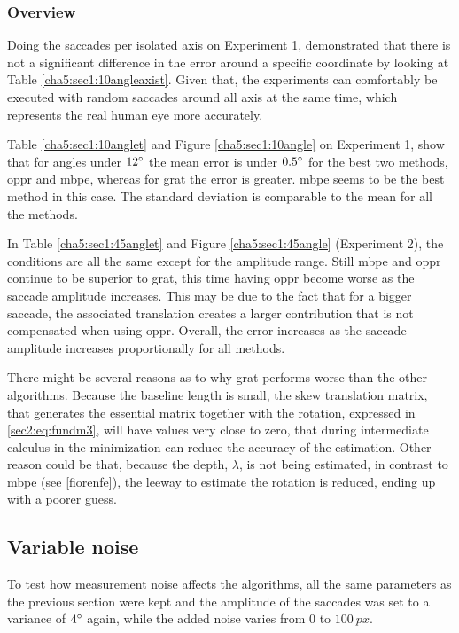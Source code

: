 \subsubsection{Overview}

Doing the saccades per isolated axis on Experiment 1, demonstrated that there is not a significant difference in the error around a specific coordinate by looking at Table \ref{cha5:sec1:10angleaxist}. Given that, the experiments can comfortably be executed with random saccades around all axis at the same time, which represents the real human eye more accurately.

Table \ref{cha5:sec1:10anglet} and Figure \ref{cha5:sec1:10angle} on Experiment 1, show that for angles under $ 12 \degree $ the mean error is under $0.5 \degree$ for the best two methods, \acrshort{oppr} and \acrshort{mbpe}, whereas for \acrshort{grat} the error is greater. \acrshort{mbpe} seems to be the best method in this case. The standard deviation is comparable to the mean for all the methods.

In Table \ref{cha5:sec1:45anglet} and Figure \ref{cha5:sec1:45angle} (Experiment 2), the conditions are all the same except for the amplitude range. Still \acrshort{mbpe} and \acrshort{oppr} continue to be superior to \acrshort{grat}, this time having \acrshort{oppr} become worse as the saccade amplitude increases. This may be due to the fact that for a bigger saccade, the associated translation creates a larger contribution that is not compensated when using \acrshort{oppr}. Overall, the error increases as the saccade amplitude increases proportionally for all methods.

There might be several reasons as to why \acrshort{grat} performs worse than the other algorithms. Because the baseline length is small, the skew translation matrix, that generates the essential matrix together with the rotation, expressed in \ref{sec2:eq:fundm3}, will have values very close to zero, that during intermediate calculus in the minimization can reduce the accuracy of the estimation. Other reason could be that, because the depth, $\lambda$, is not being estimated, in contrast to \acrshort{mbpe} (see \ref{fiorenfe}), the leeway to estimate the rotation is reduced, ending up with a poorer guess.
 

\subsection{Variable noise}
To test how measurement noise affects the algorithms, all the same parameters as the previous section were kept and the amplitude of the saccades was set to a variance of $4 \degree$ again, while the added noise varies from $0$ to $100 \ px$. 
